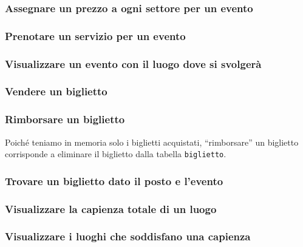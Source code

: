 \documentclass[a4paper,11pt]{article}
\begin{document}
\subsubsection{Assegnare un prezzo a ogni settore per un evento}


\subsubsection{Prenotare un servizio per un evento}


\subsubsection{Visualizzare un evento con il luogo dove si svolgerà}


\subsubsection{Vendere un biglietto}


\subsubsection{Rimborsare un biglietto}

Poiché teniamo in memoria solo i biglietti acquistati, ``rimborsare'' un biglietto corrisponde a eliminare il biglietto dalla tabella \texttt{biglietto}.



\subsubsection{Trovare un biglietto dato il posto e l'evento}


\subsubsection{Visualizzare la capienza totale di un luogo}


\subsubsection{Visualizzare i luoghi che soddisfano una capienza}

\end{document}
